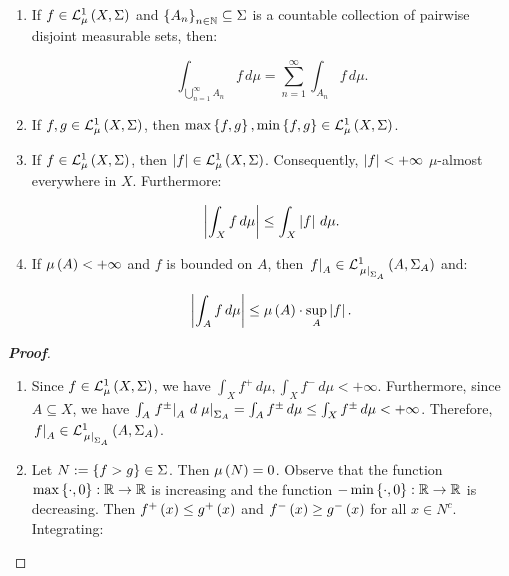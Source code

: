\begin{proposition}
\begin{enumerate}
    \begin{equation}
      \int_{A\cup B}{f\,d\mu}=\int_{A}{f\,d\mu}+\int_{B}{f\,d\mu}-\int_{A\cap B}{f\,d\mu}
    \end{equation}

    Particularly, if $A$ and $B$ are disjoint, then $\int_{A\cup B}{f\,d\mu}=\int_{A}{f\,d\mu}+\int_{B}{f\,d\mu}$.

    \item If $f\in\Leb{X}{\Sigma}{\mu}$ and $\set{A_n}_{n\in\mathbb{N}}\subseteq\Sigma$ is a countable collection of pairwise disjoint measurable sets, then:

    \begin{equation}
      \int_{\bigcup_{n=1}^{\infty}{A_n}}{f\,d\mu}=\sum_{n=1}^{\infty}{\int_{A_n}{f\,d\mu}}.
    \end{equation}
    
    \item If $f,g\in\Leb{X}{\Sigma}{\mu}$, then $\max\set{f,g},\min\set{f,g}\in\Leb{X}{\Sigma}{\mu}$.
    \item If $f\in\Leb{X}{\Sigma}{\mu}$, then $\bars{f}\in\Leb{X}{\Sigma}{\mu}$. Consequently, $\bars{f}<+\infty$ $\mu$-almost everywhere in $X$. Furthermore:
    
    \begin{equation}
      \bars{\int_{X}{f\,d\mu}}\leq\int_{X}{\bars{f}\,d\mu}.
    \end{equation}
    \item If $\mu\pr{A}<+\infty$ and $f$ is bounded on $A$, then $\rest{f}{A}\in\Leb{A}{\Sigma_A}{\rest{\mu}{\Sigma_A}}$ and:
    
    \begin{equation}
      \bars{\int_{A}{f\,d\mu}}\leq\mu\pr{A}\cdot\sup_A\bars{f}.
    \end{equation}
  \end{enumerate}
  \begin{proof}[\rm\textbf{Proof}]
    \hfill
    \begin{enumerate}
      \item Since $f\in\Leb{X}{\Sigma}{\mu}$, we have $\int_{X}{f^+\,d\mu},\int_{X}{f^-\,d\mu}<+\infty$. Furthermore, since $A\subseteq X$, we have $\int_{A}{\rest{f^\pm}{A}\,d\rest{\mu}{\Sigma_A}}=\int_{A}{f^\pm\,d\mu}\leq\int_{X}{f^\pm\,d\mu}<+\infty$. Therefore, $\rest{f}{A}\in\Leb{A}{\Sigma_A}{\rest{\mu}{\Sigma_A}}$.
      \item Let $N:=\set{f>g}\in\Sigma$. Then $\mu\pr{N}=0$. Observe that the function $\max\set{\cdot,0}:\mathbb{R}\rightarrow\mathbb{R}$ is increasing and the function $-\min\set{\cdot,0}:\mathbb{R}\rightarrow\mathbb{R}$ is decreasing. Then $f^+\pr{x}\leq g^+\pr{x}$ and $f^-\pr{x}\geq g^-\pr{x}$ for all $x\in N^c$. Integrating:


\end{enumerate}
\end{proof}
\end{proposition}
